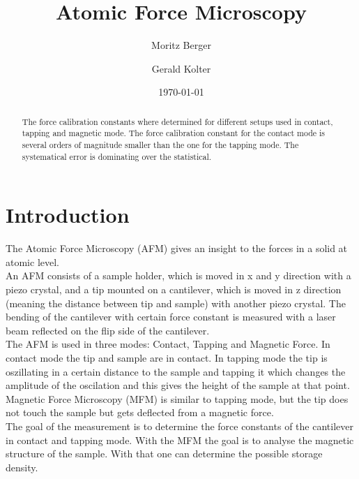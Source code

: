 \documentclass[%
 reprint,
amsmath,amssymb,
pra,
]{revtex4-1}
\begin{document}

\title{Atomic Force Microscopy}%

\author{Moritz Berger}
 \author{Gerald Kolter}

\date{\today}%

\begin{abstract}
The force calibration constants where determined for different setups used in contact, tapping and magnetic mode. The force calibration constant for the contact mode is several orders of magnitude smaller than the one for the tapping mode. The systematical error is dominating over the statistical.
\end{abstract}

\maketitle


\section{Introduction}
The Atomic Force Microscopy (AFM) gives an insight to the forces in a solid at atomic level. \\
An AFM consists of a sample holder, which is moved in x and y direction with a piezo crystal, and a tip mounted on a cantilever, which is moved in z direction (meaning the distance between tip and sample) with another piezo crystal. The bending of the cantilever with certain force constant is measured with a laser beam reflected on the flip side of the cantilever. \\
The AFM is used in three modes: Contact, Tapping and Magnetic Force. In contact mode the tip and sample are in contact. In tapping mode the tip is oszillating in a certain distance to the sample and tapping it which changes the amplitude of the oscilation and this gives the height of the sample at that point. Magnetic Force Microscopy (MFM) is similar to tapping mode, but the tip does not touch the sample but gets deflected from a magnetic force. \\
The goal of the measurement is to determine the force constants of the cantilever in contact and tapping mode. With the MFM the goal is to analyse the magnetic structure of the sample. With that one can determine the possible storage density.
\end{document}
